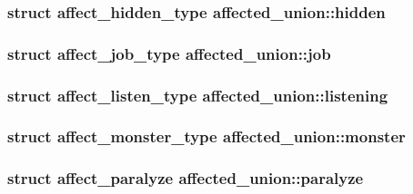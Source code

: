 \hypertarget{unionaffected__union_ac60c7e40bd2558de2b035e6bda794571}{
\subsubsection[{hidden}]{\setlength{\rightskip}{0pt plus 5cm}struct {\bf affect\-\_\-hidden\-\_\-type} affected\-\_\-union\-::hidden}}\label{unionaffected__union_ac60c7e40bd2558de2b035e6bda794571}
\hypertarget{unionaffected__union_a3fe2836525837d34ceeb03f2318020d4}{
\subsubsection[{job}]{\setlength{\rightskip}{0pt plus 5cm}struct {\bf affect\-\_\-job\-\_\-type} affected\-\_\-union\-::job}}\label{unionaffected__union_a3fe2836525837d34ceeb03f2318020d4}
\hypertarget{unionaffected__union_a38fd9ada1161469432533e35d96d6a24}{
\subsubsection[{listening}]{\setlength{\rightskip}{0pt plus 5cm}struct {\bf affect\-\_\-listen\-\_\-type} affected\-\_\-union\-::listening}}\label{unionaffected__union_a38fd9ada1161469432533e35d96d6a24}
\hypertarget{unionaffected__union_a3bd426fe92c8bc9bc11f1b7394a26f1a}{
\subsubsection[{monster}]{\setlength{\rightskip}{0pt plus 5cm}struct {\bf affect\-\_\-monster\-\_\-type} affected\-\_\-union\-::monster}}\label{unionaffected__union_a3bd426fe92c8bc9bc11f1b7394a26f1a}
\hypertarget{unionaffected__union_aead85b240b8970351cf54106b39cc4ce}{
\subsubsection[{paralyze}]{\setlength{\rightskip}{0pt plus 5cm}struct {\bf affect\-\_\-paralyze} affected\-\_\-union\-::paralyze}}\label{unionaffected__union_aead85b240b8970351cf54106b39cc4ce}
